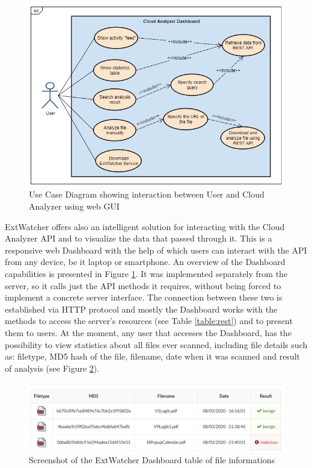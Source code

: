\begin{figure}[H]
	\centerline{\includegraphics[scale=0.7]{figures/usecaseGUI.png}}  
	\caption{Use Case Diagram showing interaction between User and Cloud Analyzer using web GUI}
	\label{usecase}
\end{figure}

ExtWatcher offers also an intelligent solution for interacting with the Cloud Analyzer API and to visualize the data that passed through it. This is a responsive web Dashboard with the help of which users can interact with the API from any device, be it laptop or smartphone. An overview of the Dashboard capabilities is presented in Figure \ref{usecase}. It was implemented separately from the server, so it calls just the API methods it requires, without being forced to implement a concrete server interface. The connection between these two is established via HTTP protocol and mostly the Dashboard works with the  methods to access the server's resources (see Table \ref{table:rest}) and to present them to users. At the moment, any user that accesses the Dashboard, has the possibility to view statistics about all files ever scanned, including file details such as: filetype, MD5 hash of the file, filename, date when it was scanned and result of analysis (see Figure \ref{screenshot:infotable}). 

\begin{figure}[H]
	\centerline{\includegraphics[scale=0.6]{figures/infotable.png}}  
	\caption{Screenshot of the ExtWatcher Dashboard table of file informations}
	\label{screenshot:infotable}
\end{figure}

